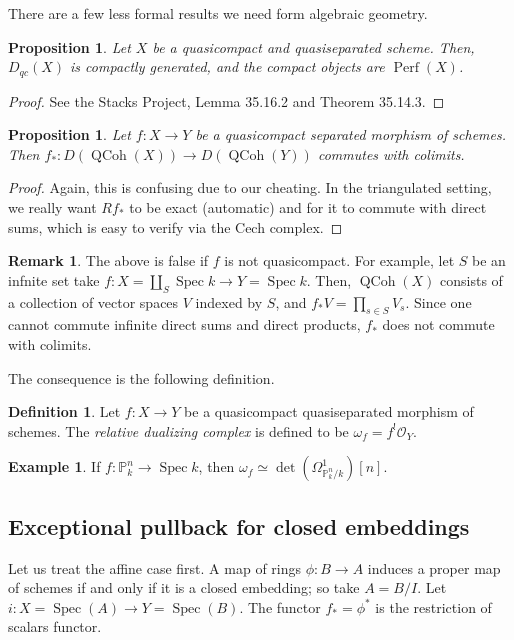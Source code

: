 \documentclass[10pt]{article}
\newtheorem{prop}[thm]{Proposition}
\theoremstyle{definition}
\newtheorem{exmp}[thm]{Example}
\newtheorem{defn}[thm]{Definition}
\newtheorem{rmk}[thm]{Remark}
\DeclareMathOperator{\Spec}{Spec}
\DeclareMathOperator{\QCoh}{QCoh}
\DeclareMathOperator{\Perf}{Perf}
\newcommand{\PP}{\mathbb{P}}
\newcommand{\OO}{\mathcal{O}}
\begin{document}
There are a few less formal results we need form algebraic geometry.
\begin{prop}
Let $X$ be a quasicompact and quasiseparated scheme.  Then, $D_{qc}(X)$ is compactly generated, and the compact objects are $\Perf(X)$.
\end{prop}
\begin{proof}
See the Stacks Project, Lemma 35.16.2 and Theorem 35.14.3.
\end{proof}

\begin{prop}
Let $f: X \rightarrow Y$ be a quasicompact separated morphism of schemes.  Then $f_*: D(\QCoh(X)) \rightarrow D(\QCoh(Y))$ commutes with colimits.
\end{prop}
\begin{proof}
Again, this is confusing due to our cheating.  In the triangulated setting, we really want $Rf_*$ to be exact (automatic) and for it to commute with direct sums, which is easy to verify via the Cech complex.
\end{proof}

\begin{rmk}
The above is false if $f$ is not quasicompact.  For example, let $S$ be an infnite set take $f: X = \coprod_S \Spec k \rightarrow Y = \Spec k$.  Then, $\QCoh(X)$ consists of a collection of vector spaces $V$ indexed by $S$, and $f_* V = \prod_{s \in S} V_s$.  Since one cannot commute infinite direct sums and direct products, $f_*$ does not commute with colimits.
\end{rmk}




The consequence is the following definition.
\begin{defn}
Let $f: X \rightarrow Y$ be a quasicompact quasiseparated morphism of schemes.  The \emph{relative dualizing complex} is defined to be $\omega_f = f^! \OO_Y$.
\end{defn}

\begin{exmp}
If $f: \PP^n_k \rightarrow \Spec k$, then $\omega_f \simeq \det(\Omega^1_{\PP^n_k/k})[n]$.
\end{exmp}



\subsection{Exceptional pullback for closed embeddings}

Let us treat the affine case first.  A map of rings $\phi: B \rightarrow A$ induces a proper map of schemes if and only if it is a closed embedding; so take $A = B/I$.  Let $i: X = \Spec(A) \rightarrow Y = \Spec(B)$.  The functor $f_* = \phi^*$ is the restriction of scalars functor.
\end{document}
